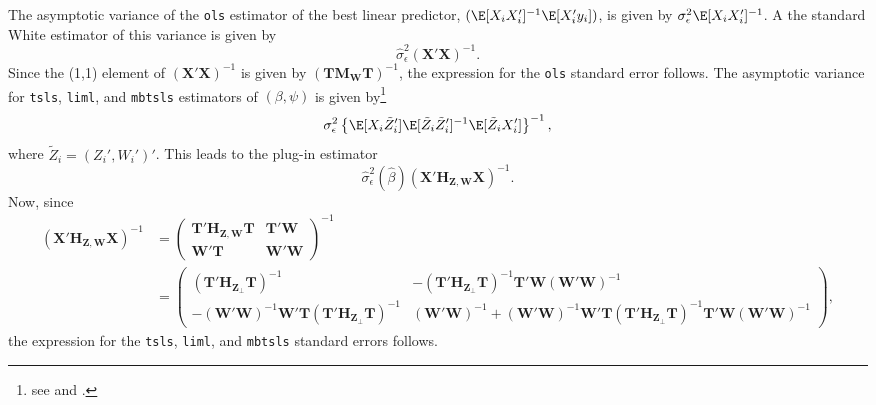 \documentclass{mynotes}
\newcommand{\bx}{\mathbf{X}} %
\newcommand{\bt}{\mathbf{T}} %
\newcommand{\bz}{\mathbf{Z}} %
\newcommand{\bw}{\mathbf{W}} %
\newcommand{\Hm}[1]{\mathbf{H}_{#1}} %
\newcommand{\Mm}[1]{\mathbf{M}_{#1}} %
\begin{document}
\begin{appendices}
The asymptotic variance of the \texttt{ols} estimator of the best linear
predictor, $(\E[X_{i}X_{i}']^{-1}\E[X_{i}'y_{i}])$, is given by
$\sigma_{\epsilon}^{2}\E[X_{i}X_{i}']^{-1}$. A the standard White estimator of
this variance is given by
\begin{equation*}
  \hat{\sigma}^{2}_{\epsilon}(\bx'\bx)^{-1}.
\end{equation*}
Since the (1,1) element of $(\bx'\bx)^{-1}$ is given by $(\bt\Mm{\bw}\bt)^{-1}$,
the expression for the \texttt{ols} standard error follows. The asymptotic
variance for \texttt{tsls}, \texttt{liml}, and \texttt{mbtsls} estimators of
$(\beta,\psi)$ is given by\footnote{see \citet[Equation 5.24]{wooldridge02} and
\citet{dm93}.}
\begin{equation*}
  \sigma^{2}_{\epsilon}\left\{\E[X_{i}\tilde{Z}_{i}']
    \E[\tilde{Z}_{i}\tilde{Z}_{i}']^{-1}\E[\tilde{Z}_{i}X_{i}']\right\}^{-1},
\end{equation*}
where $\tilde{Z}_{i}=(Z_{i}',W_{i}')'$. This leads to the plug-in estimator
\begin{equation*}
  \hat{\sigma}^{2}_{\epsilon}(\hat{\beta})(\bx' \Hm{\bz,\bw}\bx)^{-1}.
\end{equation*}
Now, since
\begin{equation*}
  \begin{split}
    (\bx'\Hm{\bz,\bw}\bx)^{-1}&=
    \begin{pmatrix}
      \bt'\Hm{\bz,\bw}\bt & \bt'\bw\\
      \bw'\bt & \bw'\bw
    \end{pmatrix}^{-1}\\
    &=
    \begin{pmatrix}
      (\bt'\Hm{\bz_{\perp}}\bt)^{-1} & -  (\bt'\Hm{\bz_{\perp}}\bt)^{-1}\bt'\bw(\bw'\bw)^{-1}\\
      -(\bw'\bw)^{-1}\bw'\bt (\bt'\Hm{\bz_{\perp}}\bt)^{-1}& (\bw'\bw)^{-1}+
      (\bw'\bw)^{-1}\bw'\bt (\bt'\Hm{\bz_{\perp}}\bt)^{-1}\bt'\bw(\bw'\bw)^{-1}
    \end{pmatrix},
  \end{split}
\end{equation*}
the expression for the \texttt{tsls}, \texttt{liml}, and \texttt{mbtsls}
standard errors follows.


\end{appendices}
\end{document}

